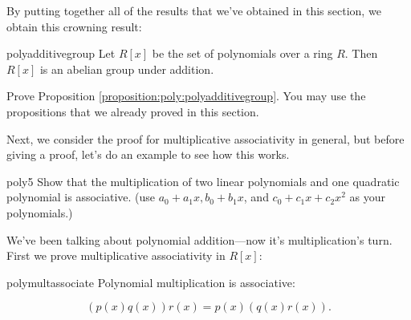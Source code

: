 %

By putting together all of the results that we've obtained in this section, we obtain this crowning result:

\begin{prop}{polyadditivegroup} Let $R[x]$ be the  set of polynomials over a ring $R$. Then $R[x]$ is an abelian group under addition. 
\end{prop}

\begin{exercise}{}
Prove Proposition \ref{proposition:poly:polyadditivegroup}. You may use the propositions that we already proved in this section.
\end{exercise}

Next, we consider the proof for multiplicative associativity in general, but before giving a proof, let's do an example to see how this works.

\begin{exercise}{poly5}
Show that the multiplication of two linear polynomials and one quadratic polynomial is associative. (use $a_0+a_1x, b_0+b_1x$, and $c_0+c_1x+c_2x^2$ as your polynomials.)
\end{exercise}

We've been talking about polynomial addition---now it's multiplication's turn. First we prove multiplicative associativity in $R[x]$:

\begin{prop}{polymultassociate} Polynomial multiplication is associative: 
	
	\[(p(x) q(x)) r(x)  = p(x) (q(x) r(x)).\]	
\end {prop}

